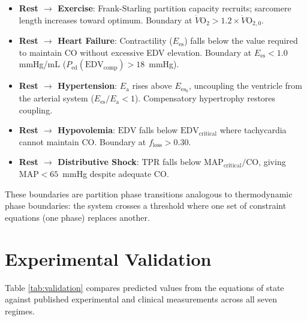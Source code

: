 \documentclass[12pt,a4paper]{article}
\theoremstyle{remark}
\newcommand{\Ees}{E_{\mathrm{es}}}
\newcommand{\Ea}{E_{\mathrm{a}}}
\newcommand{\CO}{\mathrm{CO}}
\newcommand{\MAP}{\mathrm{MAP}}
\newcommand{\TPR}{\mathrm{TPR}}
\newcommand{\EDV}{\mathrm{EDV}}
\begin{document}
\begin{itemize}
    \item \textbf{Rest $\to$ Exercise}: Frank-Starling partition capacity recruits; sarcomere length increases toward optimum. Boundary at $\dot{V}\mathrm{O}_2 > 1.2 \times \dot{V}\mathrm{O}_{2,0}$.

    \item \textbf{Rest $\to$ Heart Failure}: Contractility ($\Ees$) falls below the value required to maintain $\CO$ without excessive EDV elevation. Boundary at $\Ees < 1.0$ mmHg/mL ($P_{\mathrm{ed}}(\EDV_{\mathrm{comp}}) > 18$~mmHg).

    \item \textbf{Rest $\to$ Hypertension}: $\Ea$ rises above $\Ees_0$, uncoupling the ventricle from the arterial system ($\Ees/\Ea < 1$). Compensatory hypertrophy restores coupling.

    \item \textbf{Rest $\to$ Hypovolemia}: $\EDV$ falls below $\EDV_{\mathrm{critical}}$ where tachycardia cannot maintain $\CO$. Boundary at $f_{\mathrm{loss}} > 0.30$.

    \item \textbf{Rest $\to$ Distributive Shock}: $\TPR$ falls below $\MAP_{\mathrm{critical}}/\CO$, giving $\MAP < 65$~mmHg despite adequate $\CO$.
\end{itemize}

These boundaries are partition phase transitions analogous to thermodynamic phase boundaries: the system crosses a threshold where one set of constraint equations (one phase) replaces another.

\section{Experimental Validation}
\label{sec:validation}

Table \ref{tab:validation} compares predicted values from the equations of state against published experimental and clinical measurements across all seven regimes.
\end{document}
